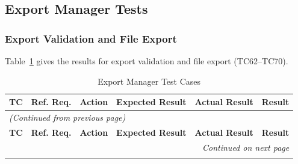 \documentclass[12pt, titlepage]{article}
\begin{document}
\subsection{Export Manager Tests}

\subsubsection{Export Validation and File Export}
Table~\ref{table:xm_tests} gives the results for export validation and file export (TC62--TC70).

\begin{longtable}{c
    >{\raggedright\arraybackslash}p{1.8cm}
    >{\raggedright\arraybackslash}p{3.5cm}
    >{\raggedright\arraybackslash}p{3.5cm}
  >{\raggedright\arraybackslash}p{5cm} c}
  \caption{Export Manager Test Cases}
  \label{table:xm_tests} \\
  \toprule
  \textbf{TC} & \textbf{Ref. Req.} & \textbf{Action} &
  \textbf{Expected Result} & \textbf{Actual Result} & \textbf{Result} \\
  \midrule
  \endfirsthead

  \multicolumn{6}{l}{\textit{(Continued from previous page)}} \\
  \toprule
  \textbf{TC} & \textbf{Ref. Req.} & \textbf{Action} &
  \textbf{Expected Result} & \textbf{Actual Result} & \textbf{Result} \\
  \midrule
  \endhead

  \multicolumn{6}{r}{\textit{Continued on next page}} \\
  \endfoot

  \bottomrule
  \endlastfoot


\end{longtable}
\end{document}
